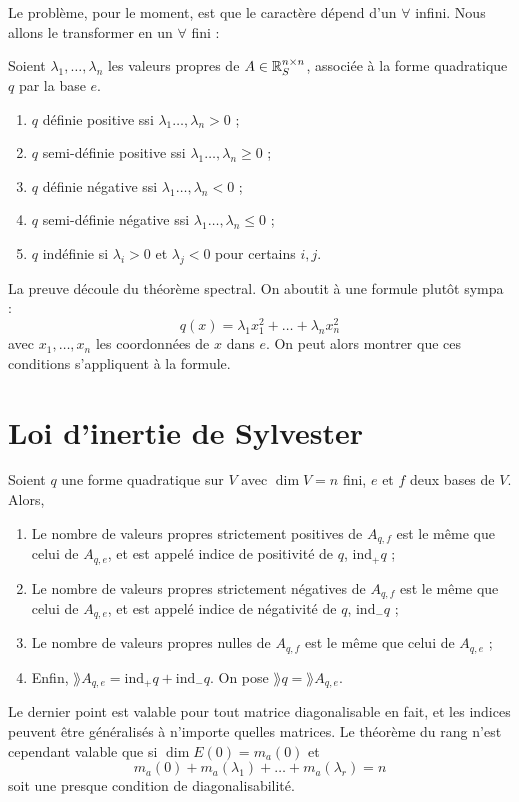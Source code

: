 Le problème, pour le moment, est que le caractère dépend d'un $\forall$ infini. Nous allons le transformer en un $\forall$ fini :
\begin{propriete}
Soient $\lambda_1, \ldots, \lambda_n$ les valeurs propres de $A \in \mathbb{R}^{n \times n}_S$, associée à la forme quadratique $q$ par la base $e$.
\begin{enumerate}
\item $q$ définie positive ssi $\lambda_1\ldots,\lambda_n > 0$ ;
\item $q$ semi-définie positive ssi $\lambda_1\ldots,\lambda_n \ge 0$ ;
\item $q$ définie négative ssi $\lambda_1\ldots,\lambda_n < 0$ ;
\item $q$ semi-définie négative ssi $\lambda_1\ldots,\lambda_n \le 0$ ;
\item $q$ indéfinie si $\lambda_i >0$ et $\lambda_j <0$ pour certains $i, j$.
\end{enumerate}
\end{propriete}

La preuve découle du théorème spectral. On aboutit à une formule plutôt sympa :
\[ q(x) = \lambda_1 x_1^2 + \ldots + \lambda_n x_n^2 \]
avec $x_1,\ldots,x_n$ les coordonnées de $x$ dans $e$. On peut alors montrer que ces conditions s'appliquent à la formule.

\section{Loi d'inertie de Sylvester}

\begin{propriete}
Soient $q$ une forme quadratique sur $V$ avec $\dim V=n$ fini, $e$ et $f$ deux bases de $V$. Alors,
\begin{enumerate}
\item Le nombre de valeurs propres strictement positives de $A_{q,f}$ est le même que celui de $A_{q,e}$, et est appelé indice de positivité de $q$, $\mathrm{ind}_+ q$ ;
\item Le nombre de valeurs propres strictement négatives de $A_{q,f}$ est le même que celui de $A_{q,e}$, et est appelé indice de négativité de $q$, $\mathrm{ind}_- q$ ;
\item Le nombre de valeurs propres nulles de $A_{q,f}$ est le même que celui de $A_{q,e}$ ;
\item Enfin, $\rang A_{q,e} = \mathrm{ind}_+ q + \mathrm{ind}_- q$. On pose $\rang q = \rang A_{q,e}$.
\end{enumerate}
\end{propriete}

Le dernier point est valable pour tout matrice diagonalisable en fait, et les indices peuvent être généralisés à n'importe quelles matrices. Le \og théorème du rang \fg{} n'est cependant valable que si $\dim E(0) = m_a(0)$ et
\[ m_a(0) + m_a(\lambda_1) + \ldots + m_a(\lambda_r) = n \]
soit une presque condition de diagonalisabilité.

% 